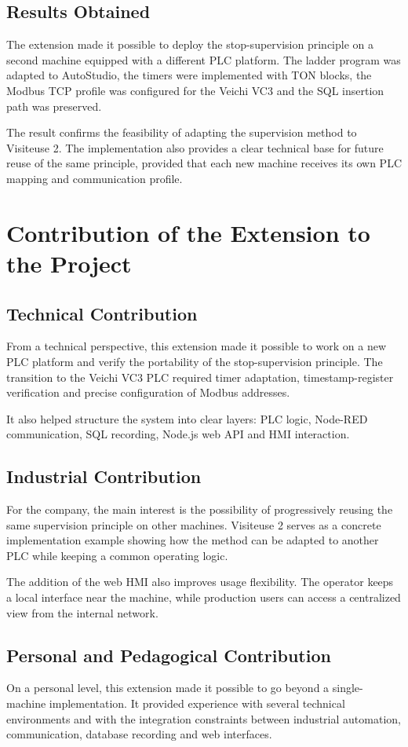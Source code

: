 \subsection{Results Obtained}
The extension made it possible to deploy the stop-supervision principle on a second machine equipped with a different PLC platform. The ladder program was adapted to AutoStudio, the timers were implemented with TON blocks, the Modbus TCP profile was configured for the Veichi VC3 and the SQL insertion path was preserved.

The result confirms the feasibility of adapting the supervision method to Visiteuse 2. The implementation also provides a clear technical base for future reuse of the same principle, provided that each new machine receives its own PLC mapping and communication profile.

\section{Contribution of the Extension to the Project}

\subsection{Technical Contribution}
From a technical perspective, this extension made it possible to work on a new PLC platform and verify the portability of the stop-supervision principle. The transition to the Veichi VC3 PLC required timer adaptation, timestamp-register verification and precise configuration of Modbus addresses.

It also helped structure the system into clear layers: PLC logic, Node-RED communication, SQL recording, Node.js web API and HMI interaction.

\subsection{Industrial Contribution}
For the company, the main interest is the possibility of progressively reusing the same supervision principle on other machines. Visiteuse 2 serves as a concrete implementation example showing how the method can be adapted to another PLC while keeping a common operating logic.

The addition of the web HMI also improves usage flexibility. The operator keeps a local interface near the machine, while production users can access a centralized view from the internal network.

\subsection{Personal and Pedagogical Contribution}
On a personal level, this extension made it possible to go beyond a single-machine implementation. It provided experience with several technical environments and with the integration constraints between industrial automation, communication, database recording and web interfaces.


